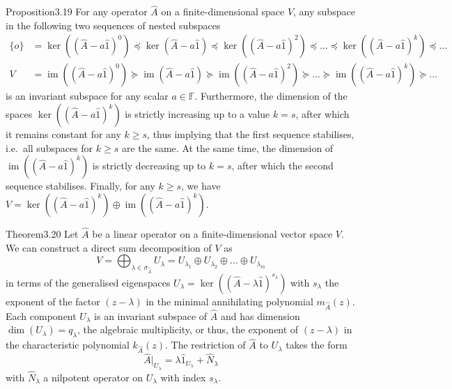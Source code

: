 \begin{res}{Proposition}{3.19}
For any operator $\hat A$ on a finite-dimensional space $V$, any subspace in the following two sequences of nested subspaces
\begin{align*}
\{o\}&=\ker((\hat A-a\hat 1)^0)\preccurlyeq\ker(\hat A-a\hat 1)\preccurlyeq\ker((\hat A-a\hat 1)^2)\preccurlyeq\ldots\preccurlyeq\ker((\hat A-a\hat 1)^k)\preccurlyeq\ldots\\
V&=\operatorname{im}((\hat A-a\hat 1)^0)\succcurlyeq\operatorname{im}(\hat A-a\hat 1)\succcurlyeq\operatorname{im}((\hat A-a\hat 1)^2)\succcurlyeq\ldots\succcurlyeq\operatorname{im}((\hat A-a\hat 1)^k)\succcurlyeq\ldots
\end{align*}
is an invariant subspace for any scalar $a\in\mathbb F$. Furthermore, the dimension of the spaces $\ker((\hat A-a\hat 1)^k)$ is strictly increasing up to a value $k=s$, after which it remains constant for any $k\ge s$, thus implying that the first sequence stabilises, i.e.\ all subspaces for $k\ge s$ are the same. At the same time, the dimension of $\operatorname{im}((\hat A-a\hat 1)^k)$ is strictly decreasing up to $k=s$, after which the second sequence stabilises. Finally, for any $k\ge s$, we have $V=\ker((\hat A-a\hat 1)^k)\oplus\operatorname{im}((\hat A-a\hat 1)^k)$.
\end{res}

\begin{res}{Theorem}{3.20}
Let $\hat A$ be a linear operator on a finite-dimensional vector space $V$. We can construct a direct sum decomposition of $V$ as
\begin{equation}V=\bigoplus_{\lambda\in\sigma_{\hat A}}U_\lambda=U_{\lambda_1}\oplus U_{\lambda_2}\oplus\ldots\oplus U_{\lambda_m}\tag{3.45}\end{equation}
in terms of the generalised eigenspaces $U_\lambda=\ker((\hat A-\lambda\hat 1)^{s_\lambda})$ with $s_\lambda$ the exponent of the factor $(z-\lambda)$ in the minimal annihilating polynomial $m_{\hat A}(z)$. Each component $U_\lambda$ is an invariant subspace of $\hat A$ and has dimension $\dim(U_\lambda)=q_\lambda$, the algebraic multiplicity, or thus, the exponent of $(z-\lambda)$ in the characteristic polynomial $k_{\hat A}(z)$. The restriction of $\hat A$ to $U_\lambda$ takes the form
\begin{equation}\hat A|_{U_\lambda}=\lambda\hat 1_{U_\lambda}+\hat N_\lambda\tag{3.46}\end{equation}
with $\hat N_\lambda$ a nilpotent operator on $U_\lambda$ with index $s_\lambda$.
\end{res}

